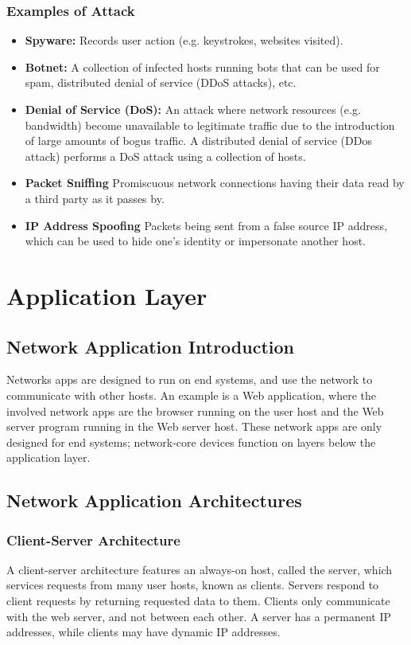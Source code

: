 \documentclass[12pt,titlepage]{article}
\begin{document}
      \subsubsection{Examples of Attack}
        \begin{itemize}
          \item \textbf{Spyware:} Records user action (e.g. keystrokes, websites visited).
          \item \textbf{Botnet:} A collection of infected hosts running bots that can be used for spam, distributed denial of service (DDoS attacks), etc.
          \item \textbf{Denial of Service (DoS):} An attack where network resources (e.g. bandwidth) become unavailable to legitimate traffic due to the
            introduction of large amounts of bogus traffic. A distributed denial of service (DDos attack) performs a DoS attack using a collection of hosts.
          \item \textbf{Packet Sniffing} Promiscuous network connections having their data read by a third party as it passes by.
          \item \textbf{IP Address Spoofing} Packets being sent from a false source IP address, which can be used to hide one's identity or impersonate another host.
        \end{itemize}

  \newpage

  \section{Application Layer}
    \subsection{Network Application Introduction}
      Networks apps are designed to run on end systems, and use the network to communicate with other hosts. An example is a Web application, where the involved network
      apps are the browser running on the user host and the Web server program running in the Web server host. These network apps are only designed for end systems;
      network-core devices function on layers below the application layer.

    \subsection{Network Application Architectures}
      \subsubsection{Client-Server Architecture}
        A client-server architecture features an always-on host, called the server, which services requests from many user hosts, known as clients. Servers respond to
        client requests by returning requested data to them. Clients only communicate with the web server, and not between each other. A server has a permanent IP addresses,
        while clients may have dynamic IP addresses.
\end{document}
